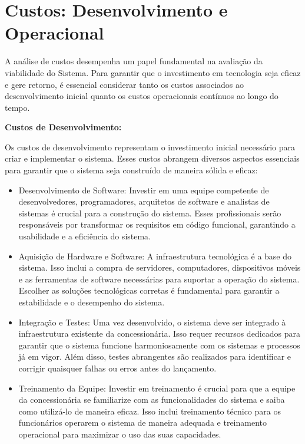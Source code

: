 \section{Custos: Desenvolvimento e Operacional} 
A análise de custos desempenha um papel fundamental na avaliação da viabilidade do Sistema. Para garantir que o investimento em tecnologia seja eficaz e gere retorno, é essencial considerar tanto os custos associados ao desenvolvimento inicial quanto os custos operacionais contínuos ao longo do tempo.

\textbf{Custos de Desenvolvimento:}

Os custos de desenvolvimento representam o investimento inicial necessário para criar e implementar o sistema. Esses custos abrangem diversos aspectos essenciais para garantir que o sistema seja construído de maneira sólida e eficaz:

\begin{itemize}
	\item Desenvolvimento de Software: Investir em uma equipe competente de desenvolvedores, programadores, arquitetos de software e analistas de sistemas é crucial para a construção do sistema. Esses profissionais serão responsáveis por transformar os requisitos em código funcional, garantindo a usabilidade e a eficiência do sistema.
	
	\item Aquisição de Hardware e Software: A infraestrutura tecnológica é a base do sistema. Isso inclui a compra de servidores, computadores, dispositivos móveis e as ferramentas de software necessárias para suportar a operação do sistema. Escolher as soluções tecnológicas corretas é fundamental para garantir a estabilidade e o desempenho do sistema.
	
	\item Integração e Testes:  Uma vez desenvolvido, o sistema deve ser integrado à infraestrutura existente da concessionária. Isso requer recursos dedicados para garantir que o sistema funcione harmoniosamente com os sistemas e processos já em vigor. Além disso, testes abrangentes são realizados para identificar e corrigir quaisquer falhas ou erros antes do lançamento.
	
	\item Treinamento da Equipe: Investir em treinamento é crucial para que a equipe da concessionária se familiarize com as funcionalidades do sistema e saiba como utilizá-lo de maneira eficaz. Isso inclui treinamento técnico para os funcionários operarem o sistema de maneira adequada e treinamento operacional para maximizar o uso das suas capacidades.\\
\end{itemize}

